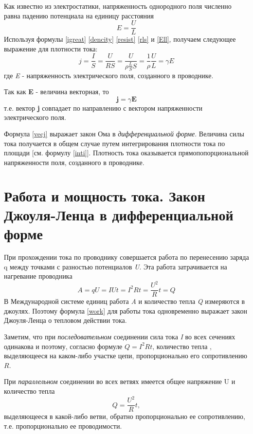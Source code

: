 \documentclass[a4paper,10pt]{book}
\let\vec\mathbf
\begin{document}
Как известно из электростатики, напряженность однородного поля численно равна падению потенциала на единицу расстояния
\begin{equation}\label{Ell}
 E = \frac{U}{L}
\end{equation}
Используя формулы \ref{igreat} \ref{dencity} \ref{resist} \ref{rls} и \ref{Ell}, получаем следующее выражение для плотности тока:
\begin{equation}\label{longf}
 j = \frac{I}{S} = \frac{U}{RS} = \frac{U}{\rho\frac{L}{S}S} = \frac{1}{\rho}\frac{U}{L} = \gamma E
\end{equation}
где \emph{E} - напряженность электрического поля, созданного в проводнике.

Так как \textbf{E} - величина векторная, то
\begin{equation}\label{vecj}
 \vec{j} = \gamma\vec{E}
\end{equation}
т.е. вектор \textbf{j} совпадает по направлению с вектором напряженности электрического поля.

Формула \ref{vecj} выражает закон Ома в \emph{дифференциальной форме}. Величина силы тока получается в общем случае путем интегрирования
плотности тока по площади [см. формулу \ref{inti}]. Плотность тока оказывается прямопопорциональной напряженности поля, созданного в проводнике.
\section{Работа и мощность тока. Закон Джоуля-Ленца в дифференциальной форме}
При прохождении тока по проводнику совершается работа по перенесению заряда q между точками с разностью потенциалов \emph{U}. Эта работа 
затрачивается на нагревание проводника
\begin{equation}\label{work}
 A = qU = IUt = I^2Rt = \frac{U^2}{R}t = Q
\end{equation}
В Международной системе единиц работа \emph{A} и количество тепла \emph{Q} измеряются в джоулях. Поэтому формула \ref{work} для работы 
тока одновременно выражает закон Джоуля-Ленца о тепловом действии тока. 

Заметим, что при \emph{последовательном} соединении сила тока \emph{I} во всех сечениях одинакова и поэтому, согласно формуле $Q = I^2Rt$,
количество тепла , выделяющееся на каком-либо участке цепи, пропорционально его сопротивлению $R$.

При \emph{параллельном} соединении во всех ветвях имеется общее напряжение U и количество тепла
\begin{equation}
 Q = \frac{U^2}{R}t, \nonumber
\end{equation}
выделяющееся в какой-либо ветви, обратно пропорционально ее сопротивлению, т.е. пропорционально ее проводимости.
\end{document}
